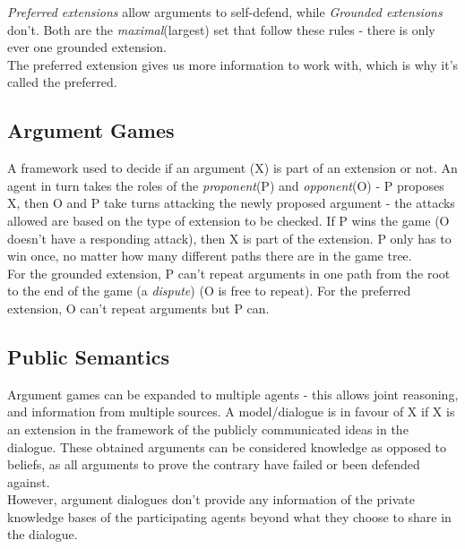 \emph{Preferred extensions} allow arguments to self-defend, while \emph{Grounded extensions} don't. Both are the \emph{maximal}(largest) set that follow these rules - there is only ever one grounded extension.\\
The preferred extension gives us more information to work with, which is why it's called the preferred.

\subsection{Argument Games}
A framework used to decide if an argument (X) is part of an extension or not. An agent in turn takes the roles of the \emph{proponent}(P) and \emph{opponent}(O) - P proposes X, then O and P take turns attacking the newly proposed argument - the attacks allowed are based on the type of extension to be checked. If P wins the game (O doesn't have a responding attack), then X is part of the extension. P only has to win once, no matter how many different paths there are in the game tree.\\

For the grounded extension, P can't repeat arguments in one path from the root to the end of the game (a \emph{dispute}) (O is free to repeat). For the preferred extension, O can't repeat arguments but P can.\\

\subsection{Public Semantics}
Argument games can be expanded to multiple agents - this allows joint reasoning, and information from multiple sources. A model/dialogue is in favour of X if X is an extension in the framework of the publicly communicated ideas in the dialogue. These obtained arguments can be considered knowledge as opposed to beliefs, as all arguments to prove the contrary have failed or been defended against. \\

However, argument dialogues don't provide any information of the private knowledge bases of the participating agents beyond what they choose to share in the dialogue.

